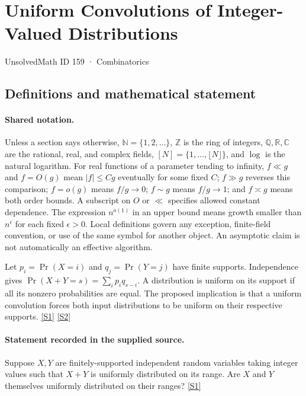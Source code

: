 \documentclass[11pt,a4paper]{article}
\newcommand{\N}{\mathbb{N}}
\newcommand{\Z}{\mathbb{Z}}
\newcommand{\Q}{\mathbb{Q}}
\newcommand{\R}{\mathbb{R}}
\newcommand{\C}{\mathbb{C}}
\newcommand{\sref}[2]{\hyperlink{source:#1:#2}{[S#2]}}
\begin{document}

\setcounter{section}{158}

\section{Uniform Convolutions of Integer-Valued Distributions}\label{159}

{\small\sffamily UnsolvedMath ID 159 · Combinatorics}

\subsection{Definitions and mathematical statement}

\paragraph{Shared notation.}Unless a section says otherwise, $\N=\{1,2,\ldots\}$,
$\Z$ is the ring of integers, $\Q,\R,\C$ are the rational, real, and complex
fields, $[N]=\{1,\ldots,\lfloor N\rfloor\}$, and $\log$ is the natural
logarithm. For real functions of a parameter tending to infinity,
$f\ll g$ and $f=O(g)$ mean $|f|\leq Cg$ eventually for some fixed $C$;
$f\gg g$ reverses this comparison; $f=o(g)$ means $f/g\to0$;
$f\sim g$ means $f/g\to1$; and $f\asymp g$ means both order bounds.
A subscript on $O$ or $\ll$ specifies allowed constant dependence.
The expression $n^{o(1)}$ in an upper bound means growth smaller than
$n^\epsilon$ for each fixed $\epsilon>0$. Local definitions govern any
exception, finite-field convention, or use of the same symbol for another
object. An asymptotic claim is not automatically an effective algorithm.



Let $p_i=\Pr(X=i)$ and $q_j=\Pr(Y=j)$ have finite supports. Independence gives $\Pr(X+Y=s)=\sum_i p_iq_{s-i}$. A distribution is uniform on its support if all its nonzero probabilities are equal. The proposed implication is that a uniform convolution forces both input distributions to be uniform on their respective supports. \sref{159}{1} \sref{159}{2}

\paragraph{Statement recorded in the supplied source.}
Suppose $X, Y$ are finitely-supported independent random variables taking integer values such that $X + Y$ is uniformly distributed on its range. Are $X$ and $Y$ themselves uniformly distributed on their ranges? \sref{159}{1}
\end{document}
